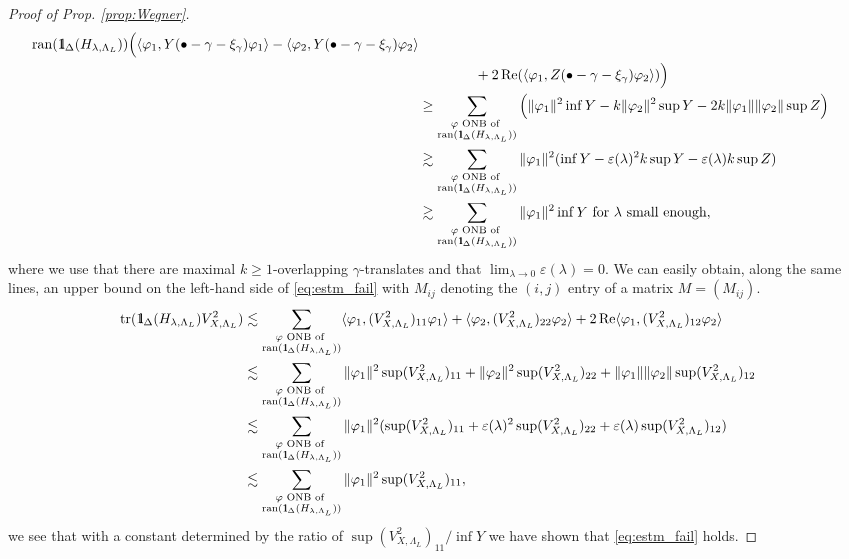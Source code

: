 \documentclass[reqno,12pt,letterpaper]{amsart}
\numberwithin{equation}{section}
\DeclareMathOperator{\Real}{Re}
\let\Re=\Real
\DeclareMathOperator{\tr}{tr}
\def\indic{\operatorname{1\hskip-2.75pt\relax l}}
\begin{document}
\begin{proof}[Proof of Prop. \ref{prop:Wegner}]
{\[\begin{split}
{{\operatorname{ran}(\indic_{\Delta}(H_{\lambda,\Lambda_L}))}} \Big( \langle \varphi_1, Y(\bullet-\gamma-\xi_{\gamma})\varphi_1\rangle- \langle \varphi_2, Y(\bullet-\gamma-\xi_{\gamma})\varphi_2\rangle \\
 &\qquad \qquad + 2\Re( \langle \varphi_1,Z(\bullet-\gamma-\xi_{\gamma}) \varphi_2\rangle ) \Big) \\ 
&\ge  \sum_{\substack{\varphi \text{ ONB of } \\
\operatorname{ran}(\indic_{\Delta}(H_{\lambda,\Lambda_L}))}} \Big(\Vert \varphi_1\Vert^2 \inf Y-k \Vert \varphi_2\Vert^2 \sup Y -2k \Vert \varphi_1\Vert \Vert \varphi_2\Vert \sup Z\Big) \\ 
& \gtrsim \sum_{\substack{\varphi \text{ ONB of } \\
\operatorname{ran}(\indic_{\Delta}(H_{\lambda,\Lambda_L}))}}\Vert \varphi_1\Vert^2 (\inf Y- \varepsilon(\lambda)^2 k \sup Y -\varepsilon(\lambda) k \sup Z) \\
& \gtrsim \sum_{\substack{\varphi \text{ ONB of } \\
\operatorname{ran}(\indic_{\Delta}(H_{\lambda,\Lambda_L}))}} \Vert \varphi_1\Vert^2 \inf Y \text{ for }\lambda \text{ small enough},
\end{split}\]
where we use that there are maximal $k \ge 1$-overlapping $\gamma$-translates and that $\lim_{\lambda \to 0} \varepsilon(\lambda)=0.$ }We can easily obtain, along the same lines, an upper bound on the left-hand side of \eqref{eq:estm_fail}{ with $M_{ij}$ denoting the $(i,j)$ entry of a matrix $M=(M_{ij}).$
\[\begin{split} \tr(  \indic_{\Delta}(H_{\lambda,\Lambda_L})V_{X,\Lambda_L}^2 ) 
& \lesssim  \sum_{\substack{\varphi \text{ ONB of } \\
\operatorname{ran}(\indic_{\Delta}(H_{\lambda,\Lambda_L}))}} \langle \varphi_1,  (V_{X,\Lambda_L}^2)_{11} \varphi_1 \rangle +  \langle \varphi_2,  (V_{X,\Lambda_L}^2)_{22} \varphi_2 \rangle + 2\Re\langle \varphi_1,(V_{X,\Lambda_L}^2)_{12} \varphi_2 \rangle  \\
& \lesssim  \sum_{\substack{\varphi \text{ ONB of } \\
\operatorname{ran}(\indic_{\Delta}(H_{\lambda,\Lambda_L}))}} \Vert \varphi_1 \Vert^2  \sup (V_{X,\Lambda_L}^2)_{11} + \Vert \varphi_2 \Vert^2  \sup (V_{X,\Lambda_L}^2)_{22} + \Vert \varphi_1 \Vert \Vert \varphi_2 \Vert  \sup (V_{X,\Lambda_L}^2)_{12} \\
& \lesssim  \sum_{\substack{\varphi \text{ ONB of } \\
\operatorname{ran}(\indic_{\Delta}(H_{\lambda,\Lambda_L}))}} \Vert \varphi_1 \Vert^2 ( \sup (V_{X,\Lambda_L}^2)_{11} + \varepsilon(\lambda)^2  \sup (V_{X,\Lambda_L}^2)_{22} +   \varepsilon(\lambda)  \sup (V_{X,\Lambda_L}^2)_{12}) \\
& \lesssim  \sum_{\substack{\varphi \text{ ONB of } \\
\operatorname{ran}(\indic_{\Delta}(H_{\lambda,\Lambda_L}))}} \Vert \varphi_1 \Vert^2 \sup (V_{X,\Lambda_L}^2)_{11},
\end{split} \]
we see that with a constant determined by the ratio of $\sup (V_{X,\Lambda_L}^2)_{11}/\inf Y$ we have shown that \eqref{eq:estm_fail} holds.}


\end{proof}
\end{document}
